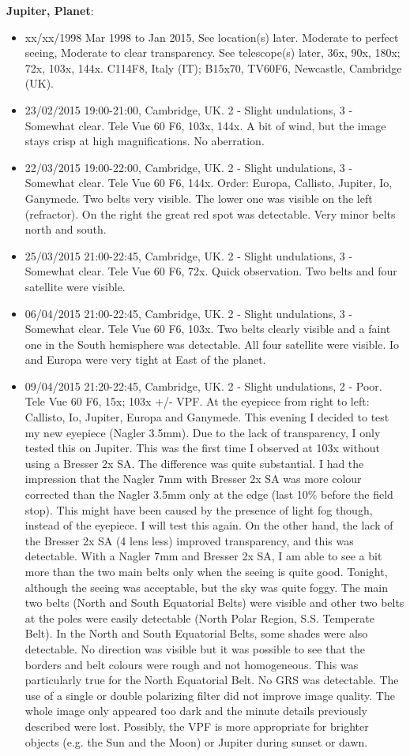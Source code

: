 {\bf Jupiter, Planet}:
\begin{itemize}
\item xx/xx/1998 Mar 1998 to Jan 2015, See location(s) later. Moderate to perfect seeing, Moderate to clear transparency. See telescope(s) later, 36x, 90x, 180x; 72x, 103x, 144x. C114F8, Italy (IT); B15x70, TV60F6, Newcastle, Cambridge (UK).
\item 23/02/2015 19:00-21:00, Cambridge, UK. 2 - Slight undulations, 3 - Somewhat clear. Tele Vue 60 F6, 103x, 144x. A bit of wind, but the image stays crisp at high magnifications. No aberration.
\item 22/03/2015 19:00-22:00, Cambridge, UK. 2 - Slight undulations, 3 - Somewhat clear. Tele Vue 60 F6, 144x. Order: Europa, Callisto, Jupiter, Io, Ganymede. Two belts very visible. The lower one was visible on the left (refractor). On the right the great red spot was detectable. Very minor belts north and south. 
\item 25/03/2015 21:00-22:45, Cambridge, UK. 2 - Slight undulations, 3 - Somewhat clear. Tele Vue 60 F6, 72x. Quick observation. Two belts and four satellite were visible. 
\item 06/04/2015 21:00-22:45, Cambridge, UK. 2 - Slight undulations, 3 - Somewhat clear. Tele Vue 60 F6, 103x. Two belts clearly visible and a faint one in the South hemisphere was detectable. All four satellite were visible. Io and Europa were very tight at East of the planet.
\item 09/04/2015 21:20-22:45, Cambridge, UK. 2 - Slight undulations, 2 - Poor. Tele Vue 60 F6, 15x; 103x +/- VPF. At the eyepiece from right to left: Callisto, Io, Jupiter, Europa and Ganymede. This evening I decided to test my new eyepiece (Nagler 3.5mm). Due to the lack of transparency, I only tested this on Jupiter. This was the first time I observed at 103x without using a Bresser 2x SA. The difference was quite substantial. I had the impression that the Nagler 7mm with Bresser 2x SA was more colour corrected than the Nagler 3.5mm only at the edge (last 10\% before the field stop). This might have been caused by the presence of light fog though, instead of the eyepiece. I will test this again. On the other hand, the lack of the Bresser 2x SA (4 lens less) improved transparency, and this was detectable. With a Nagler 7mm and Bresser 2x SA, I am able to see a bit more than the two main belts only when the seeing is quite good. Tonight, although the seeing was acceptable, but the sky was quite foggy. The main two belts (North and South Equatorial Belts) were visible and other two belts at the poles were easily detectable (North Polar Region, S.S. Temperate Belt). In the North and South Equatorial Belts, some shades were also detectable. No direction was visible but it was possible to see that the borders and belt colours were rough and not homogeneous. This was particularly true for the North Equatorial Belt. No GRS was detectable. The use of a single or double polarizing filter did not improve image quality. The whole image only appeared too dark and the minute details previously described were lost. Possibly, the VPF is more appropriate for brighter objects (e.g. the Sun and the Moon) or Jupiter during sunset or dawn. 

\end{itemize}
